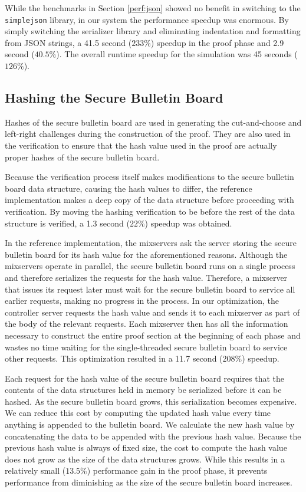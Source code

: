 While the benchmarks in Section \ref{perf:json} showed no benefit in switching to the \texttt{simplejson} library, in our system the performance speedup was enormous. By simply switching the serializer library and eliminating indentation and formatting from JSON strings, a 41.5 second ($233\%$) speedup in the proof phase and 2.9 second ($40.5\%$). The overall runtime speedup for the simulation was 45 seconds ($126\%$).

\subsection{Hashing the Secure Bulletin Board} \label{perf:optimizations:sbb}

Hashes of the secure bulletin board are used in generating the cut-and-choose and left-right challenges during the construction of the proof. They are also used in the verification to ensure that the hash value used in the proof are actually proper hashes of the secure bulletin board.

Because the verification process itself makes modifications to the secure bulletin board data structure, causing the hash values to differ, the reference implementation makes a deep copy of the data structure before proceeding with verification. By moving the hashing verification to be before the rest of the data structure is verified, a 1.3 second ($22\%$) speedup was obtained.

In the reference implementation, the mixservers ask the server storing the secure bulletin board for its hash value for the aforementioned reasons. Although the mixservers operate in parallel, the secure bulletin board runs on a single process and therefore serializes the requests for the hash value. Therefore, a mixserver that issues its request later must wait for the secure bulletin board to service all earlier requests, making no progress in the process. In our optimization, the controller server requests the hash value and sends it to each mixserver as part of the body of the relevant requests. Each mixserver then has all the information necessary to construct the entire proof section at the beginning of each phase and wastes no time waiting for the single-threaded secure bulletin board to service other requests. This optimization resulted in a 11.7 second ($208\%$) speedup.

Each request for the hash value of the secure bulletin board requires that the contents of the data structures held in memory be serialized before it can be hashed. As the secure bulletin board grows, this serialization becomes expensive. We can reduce this cost by computing the updated hash value every time anything is appended to the bulletin board. We calculate the new hash value by concatenating the data to be appended with the previous hash value. Because the previous hash value is always of fixed size, the cost to compute the hash value does not grow as the size of the data structures grows. While this results in a relatively small ($13.5\%$) performance gain in the proof phase, it prevents performance from diminishing as the size of the secure bulletin board increases.


